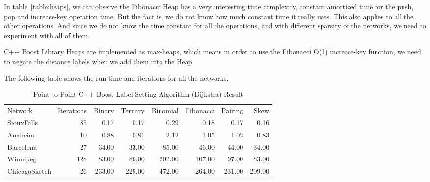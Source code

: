 In table~\ref{table:heaps},
we can observe the Fibonacci Heap has a very interesting time complexity,
constant amortized time for the push, pop and increase-key operation time.
But the fact is,
we do not know how much constant time it really uses.
This also applies to all the other operations.
And since we do not know the time constant for all the operations,
and with different sparsity of the networks,
we need to experiment with all of them.

C++ Boost Library Heaps are implemented as max-heaps,
which means in order to use the Fibonacci O(1) increase-key function,
we need to negate the distance labels when we add them into the Heap

The following table shows the run time and iterations for all the networks.
\begin{table}[H]
    \centering
    \begin{tabular}{lrrrrrrr}
        Network       & Iterations & Binary & Ternary & Binomial & Fibonacci & Pairing & Skew \\
        SiouxFalls    & 85         & 0.17 & 0.17 & 0.29 & 0.18 & 0.17 & 0.16                  \\
        Anaheim       & 10         & 0.88 & 0.81 & 2.12  & 1.05 & 1.02 & 0.83                 \\
        Barcelona     & 27         & 34.00 & 33.00 & 85.00 & 46.00 & 44.00 & 34.00            \\
        Winnipeg      & 128        & 83.00 & 86.00 & 202.00 & 107.00 & 97.00 & 83.00          \\
        ChicagoSketch & 26         & 233.00 & 229.00 & 472.00 & 264.00 & 231.00 & 209.00      
    \end{tabular}
    \caption{Point to Point C++ Boost Label Setting Algorithm (Dijkstra) Result}
    \label{table:dijkstraresult}
\end{table}

